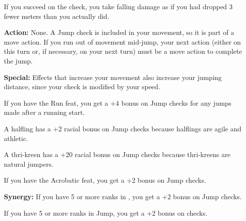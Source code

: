 If you succeed on the check, you take falling damage as if you had dropped 3 fewer meters than you actually did.

\textbf{Action:} None. A Jump check is included in your movement, so it is part of a move action. If you run out of movement mid-jump, your next action (either on this turn or, if necessary, on your next turn) must be a move action to complete the jump.

\textbf{Special:} Effects that increase your movement also increase your jumping distance, since your check is modified by your speed.

If you have the Run feat, you get a +4 bonus on Jump checks for any jumps made after a running start.

A halfling has a +2 racial bonus on Jump checks because halflings are agile and athletic.

A thri-kreen has a +20 racial bonus on Jump checks because thri-kreens are natural jumpers.

If you have the Acrobatic feat, you get a +2 bonus on Jump checks.

\textbf{Synergy:} If you have 5 or more ranks in , you get a +2 bonus on Jump checks.

If you have 5 or more ranks in Jump, you get a +2 bonus on  checks.
